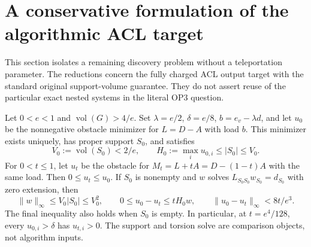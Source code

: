 \section{A conservative formulation of the algorithmic ACL target}
\label{sec:op3-conservative-envelope-equivalence}

This section isolates a remaining discovery problem without a teleportation
parameter. The reductions concern the fully charged ACL output target
with the standard original support-volume guarantee. They do not assert
reuse of the particular exact nested systems in the literal OP3 question.

\begin{lemma}
\label{lem:op3-conservative-torsion-comparison}
Let $0<e<1$ and $\operatorname{vol}(G)>4/e$. Set
$\lambda=e/2$, $\delta=e/8$, $b=e_v-\lambda d$, and let $u_0$ be
the nonnegative obstacle minimizer for $L=D-A$ with load $b$.
This minimizer exists uniquely, has proper support $S_0$, and satisfies
\[
 V_0:=\operatorname{vol}(S_0)<2/e,\qquad
 H_0:=\max_i u_{0,i}\leq|S_0|\leq V_0.
\]
For $0<t\leq1$, let $u_t$ be the obstacle for
$M_t=L+tA=D-(1-t)A$ with the same load. Then $0\leq u_t\leq u_0$.
If $S_0$ is nonempty and $w$ solves
$L_{S_0S_0}w_{S_0}=d_{S_0}$ with zero extension, then
\[
 \|w\|_\infty\leq V_0|S_0|\leq V_0^2,
 \qquad
 0\leq u_0-u_t\leq tH_0w,
 \qquad
 \|u_0-u_t\|_\infty<8t/e^3.
\]
The final inequality also holds when $S_0$ is empty. In particular,
at $t=e^4/128$, every $u_{0,i}>\delta$ has $u_{t,i}>0$.
The support and torsion solve are comparison objects, not algorithm inputs.
\end{lemma}
